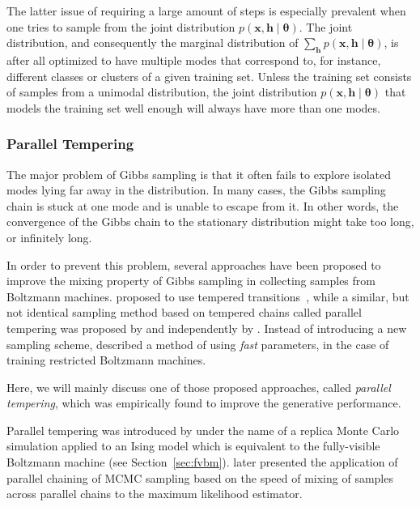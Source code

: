 \documentclass{now}
\newcommand{\vect}[1]{\mathbf{#1}}
\newcommand{\vects}[1]{\boldsymbol{#1}}
\newcommand{\vh}[0]{\vect{h}}
\newcommand{\vx}[0]{\vect{x}}
\newcommand{\TT}[0]{{\vects{\theta}}}
\begin{document}
The latter issue of requiring a large amount of steps is especially prevalent
when one tries to sample from the joint distribution $p(\vx, \vh \mid \TT)$.
The joint distribution, and consequently the marginal distribution of
$\sum_{\vh} p(\vx, \vh \mid \TT)$, is after all optimized to have multiple modes
that correspond to, for instance, different classes or clusters of a given
training set. Unless the training set consists of samples from a unimodal
distribution, the joint distribution $p(\vx, \vh \mid \TT)$ that models the
training set well enough will always have more than one modes.


\subsubsection{Parallel Tempering}
\label{sec:parallel_tempering}

The major problem of Gibbs sampling is that it often fails to explore isolated
modes lying far away in the distribution.  In many cases, the Gibbs sampling
chain is stuck at one mode and is unable to escape from it. In other words, the
convergence of the Gibbs chain to the stationary distribution might take too
long, or infinitely long.

In order to prevent this problem, several approaches have been proposed to
improve the mixing property of Gibbs sampling in collecting samples from
Boltzmann machines.  \citet{Salakhutdinov2009} proposed to use tempered
transitions~\citep{Neal1994}, while a similar, but not identical sampling method
based on tempered chains called parallel tempering was proposed by
\citet{Cho2010} and independently by \citet{Desjardins2010,Desjardins2010a}.
Instead of introducing a new sampling scheme, \citet{Tieleman2009} described a
method of using \textit{fast} parameters, in the case of training restricted
Boltzmann machines.

Here, we will mainly discuss one of those proposed approaches, called
\textit{parallel tempering}, which was empirically found to improve the
generative performance.

Parallel tempering was introduced by \citet{Swendsen1986} under the name of a
replica Monte Carlo simulation applied to an Ising model which is equivalent to
the fully-visible Boltzmann machine (see Section~\ref{sec:fvbm}).
\citet{Geyer1991} later presented the application of parallel chaining of MCMC
sampling based on the speed of mixing of samples across parallel chains to the
maximum likelihood estimator.
\end{document}
